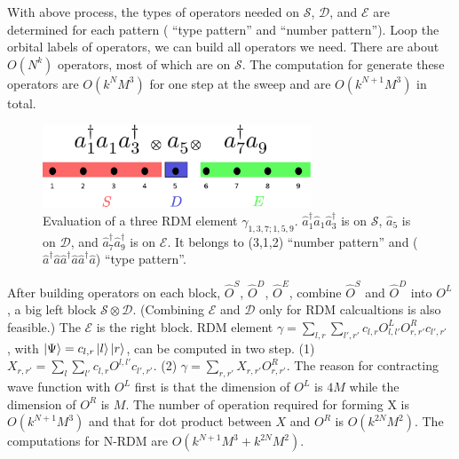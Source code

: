 With above process, the types of operators needed on $\mathcal{S}$, $\mathcal{D}$, and $\mathcal{E}$ are determined for each pattern ( ``type pattern'' and ``number pattern''). Loop the orbital labels of operators, we can build all operators we need. There are about $O(N^k)$ operators, most of which are on $\mathcal{S}$.
  The computation for generate these operators are $O(k^NM^3)$ for one step at the sweep and are $O(k^{N+1}M^3)$ in total.   

\begin{figure}\label{fig:operator_split}
  \includegraphics[width=8cm]{operator_split.eps}
  \caption{Evaluation of a three RDM element $\gamma_{1,3,7;1,5,9}$. $\hat{a}_1^\dagger\hat{a}_1\hat{a}^\dagger_3$ is on $\mathcal{S}$, $\hat{a}_5$ is on $\mathcal{D}$, and $\hat{a}^\dagger_7\hat{a}^\dagger_9$ is on $\mathcal{E}$. It belongs to (3,1,2) ``number pattern'' and ($\hat{a}^\dagger\hat{a}\hat{a}^\dagger\hat{a}\hat{a}^\dagger\hat{a}$) ``type pattern''.}
\end{figure}

  After building operators on each block, $\hat{O}^S$, $\hat{O}^D$, $\hat{O}^E$, combine $\hat{O}^S$ and $\hat{O}^D$ into $O^L$, a big left block $\mathcal{S}\otimes \mathcal{D}$. (Combining $\mathcal{E}$ and $\mathcal{D}$ only for RDM calcualtions is also feasible.) The $\mathcal{E}$ is the right block.
  RDM element $\gamma = \sum_{l,r}\sum_{l',r'} c_{l,r} O^{L}_{l,l'} O^R_{r,r'}c_{l',r'}$ , with $\ket{\Psi} = c_{l,r}\ket{l}\ket{r}$, can be computed in two step. (1) $X_{r,r'} = \sum_{l}\sum_{l'} c_{l,r} O^{l,l'} c_{l',r'}$. (2) $\gamma = \sum_{r,r'} X_{r,r'} O^R_{r,r'}$.
  The reason for contracting wave function with $O^L$ first is that the dimension of $O^L$ is $4M$ while the dimension of $O^R$ is $M$.
  The number of operation required for forming X is $O(k^{N+1}M^3)$ and that for dot product between $X$ and $O^R$ is $O(k^{2N}M^2)$. 
  The computations for N-RDM are $O(k^{N+1}M^3+k^{2N}M^2)$.




